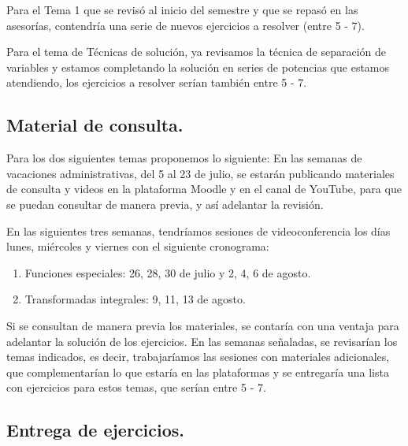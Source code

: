 Para el Tema 1 que se revisó al inicio del semestre y que se repasó en las asesorías, contendría una serie de nuevos ejercicios a resolver (entre 5 - 7).
\par
Para el tema de Técnicas de solución, ya revisamos la técnica de separación de variables y estamos completando la solución en series de potencias que estamos atendiendo, los ejercicios a resolver serían también entre 5 - 7.

\subsection{Material de consulta.}

Para los dos siguientes temas proponemos lo siguiente: En las semanas de vacaciones administrativas, del 5 al 23 de julio, se estarán publicando materiales de consulta y videos en la plataforma Moodle y en el canal de YouTube, para que se puedan consultar de manera previa, y así adelantar la revisión.
\par
En las siguientes tres semanas, tendríamos sesiones de videoconferencia los días lunes, miércoles y viernes con el siguiente cronograma:
\begin{enumerate}
\item Funciones especiales: 26, 28, 30 de julio y 2, 4, 6 de agosto.
\item Transformadas integrales: 9, 11, 13 de agosto.
\end{enumerate}

Si se consultan de manera previa los materiales, se contaría con una ventaja para adelantar la solución de los ejercicios. En las semanas señaladas, se revisarían los temas indicados, es decir, trabajaríamos las sesiones con materiales adicionales, que complementarían lo que estaría en las plataformas y se entregaría una lista con ejercicios para estos temas, que serían entre 5 - 7.

\subsection{Entrega de ejercicios.}

